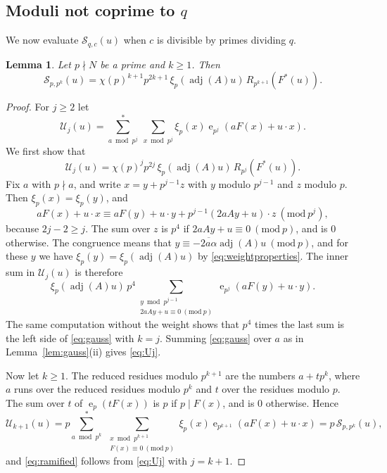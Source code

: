 \documentclass[11pt]{amsart}
\numberwithin{equation}{section}
\numberwithin{figure}{section}
\newtheorem{lemma}{Lemma}[section]
\theoremstyle{definition}
\newcommand{\F}{\mathcal{F}}
\newcommand{\e}{\operatorname{e}}
\newcommand{\imod}[1]{\ (\mathrm{mod}\ #1)}
\newcommand{\adj}{\operatorname{adj}}
\begin{document}
\subsection{Moduli not coprime to \texorpdfstring{$q$}{q}}\label{sec:ramified}

We now evaluate $\mathcal S_{q,c}(u)$ when $c$ is divisible by primes
dividing $q$.

\begin{lemma}\label{lem:ramified}
Let $p\nmid N$ be a prime and $k\ge1$. Then
\begin{equation}\label{eq:ramified}
 \mathcal S_{p,p^k}(u)
 =\chi(p)^{k+1}p^{2k+1}\,\xi_p(\adj(A)u)\,R_{p^{k+1}}(F^*(u)).
\end{equation}
\end{lemma}

\begin{proof}
For $j\ge2$ let
\[
 \mathcal U_j(u)=\sum_{a\bmod p^j}^{*}\ \sum_{x\bmod p^j}
 \xi_p(x)\e_{p^j}(aF(x)+u\cdot x).
\]
We first show that
\begin{equation}\label{eq:Uj}
 \mathcal U_j(u)=\chi(p)^jp^{2j}\,\xi_p(\adj(A)u)\,R_{p^j}(F^*(u)).
\end{equation}
Fix $a$ with $p\nmid a$, and write $x=y+p^{j-1}z$ with $y$ modulo
$p^{j-1}$ and $z$ modulo $p$. Then $\xi_p(x)=\xi_p(y)$, and
\[
 aF(x)+u\cdot x\equiv aF(y)+u\cdot y+p^{j-1}(2aAy+u)\cdot z\imod{p^j},
\]
because $2j-2\ge j$. The sum over $z$ is $p^4$ if
$2aAy+u\equiv0\imod p$, and is $0$ otherwise. The congruence means
that $y\equiv-\overline{2a\alpha}\adj(A)u\imod p$, and for these $y$
we have $\xi_p(y)=\xi_p(\adj(A)u)$ by \eqref{eq:weightproperties}.
The inner sum in $\mathcal U_j(u)$ is therefore
\[
 \xi_p(\adj(A)u)\,p^4
 \sum_{\substack{y\bmod p^{j-1}\\2aAy+u\equiv0\imod p}}
 \e_{p^j}(aF(y)+u\cdot y).
\]
The same computation without the weight shows that $p^4$ times the
last sum is the left side of \eqref{eq:gauss} with $k=j$. Summing
\eqref{eq:gauss} over $a$ as in Lemma~\ref{lem:gauss}(ii) gives
\eqref{eq:Uj}.

Now let $k\ge1$. The reduced residues modulo $p^{k+1}$ are the
numbers $a+tp^k$, where $a$ runs over the reduced residues modulo
$p^k$ and $t$ over the residues modulo $p$. The sum over $t$ of
$\e_p(tF(x))$ is $p$ if $p\mid F(x)$, and is $0$ otherwise. Hence
\[
 \mathcal U_{k+1}(u)=p\sum_{a\bmod p^k}^{*}\
 \sum_{\substack{x\bmod p^{k+1}\\F(x)\equiv0\imod p}}
 \xi_p(x)\e_{p^{k+1}}(aF(x)+u\cdot x)=p\,\mathcal S_{p,p^k}(u),
\]
and \eqref{eq:ramified} follows from \eqref{eq:Uj} with $j=k+1$.
\end{proof}
\end{document}
